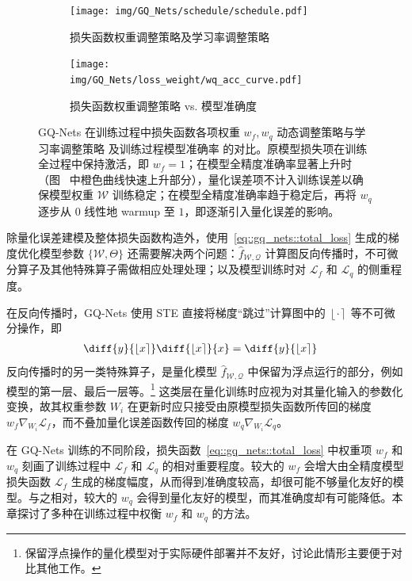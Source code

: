 \documentclass[
  fontset = mac,
]{shtthesis}
\providecommand{\Round}[1]{\left\lfloor #1 \right\rceil}
\begin{document}
\begin{figure}[htb]
  \centering
  \begin{subfigure}[t]{0.45\columnwidth}
    \centering
    \texttt{[image: img/GQ\_Nets/schedule/schedule.pdf]}
    \caption{损失函数权重调整策略及学习率调整策略}
    \label{img::gq_nets::w_fq_schedule}
  \end{subfigure}
  \quad
  \begin{subfigure}[t]{0.45\columnwidth}
    \centering
    \texttt{[image: img/GQ\_Nets/loss\_weight/wq\_acc\_curve.pdf]}
    \caption{损失函数权重调整策略 vs. 模型准确度}
    \label{img::gq_nets::schedule_acc}
  \end{subfigure}
  \caption{GQ-Nets 在训练过程中损失函数各项权重 $w_f, w_q$ 动态调整策略与学习率调整策略  及训练过程模型准确率  的对比。原模型损失项在训练全过程中保持激活，即 $w_f = 1$；在模型全精度准确率显著上升时（图~ 中橙色曲线快速上升部分），量化误差项不计入训练误差以确保模型权重 $\mathcal{W}$ 训练稳定；在模型全精度准确率趋于稳定后，再将 $w_q$ 逐步从 $0$ 线性地 warmup 至 $1$，即逐渐引入量化误差的影响。}
  \label{img::gq_nets::schedule}
\end{figure}

除量化误差建模及整体损失函数构造外，使用~\eqref{eq::gq_nets::total_loss} 生成的梯度优化模型参数 $\{\mathcal{W}, \Theta\}$ 还需要解决两个问题：$\hat{f}_{\mathcal{W, Q}}$ 计算图反向传播时，不可微分算子及其他特殊算子需做相应处理处理；以及模型训练时对 $\mathcal{L}_f$ 和 $\mathcal{L}_q$ 的侧重程度。

在反向传播时，GQ-Nets 使用 STE 直接将梯度“跳过”计算图中的 $\Round{\cdot}$ 等不可微分操作，即
\begin{align}
  \diff{y}{\Round{x}} \diff{\Round{x}}{x} &= \diff{y}{\Round{x}}
\end{align}
反向传播时的另一类特殊算子，是量化模型 $\hat{f}_{\mathcal{W, Q}}$ 中保留为浮点运行的部分，例如模型的第一层、最后一层等。\footnote{保留浮点操作的量化模型对于实际硬件部署并不友好，讨论此情形主要便于对比其他工作。} 这类层在量化训练时应视为对其量化输入的参数化变换，故其权重参数 $W_i$ 在更新时应只接受由原模型损失函数所传回的梯度 $w_f \nabla_{W_i}\mathcal{L}_f$，而不叠加量化误差函数传回的梯度 $w_q \nabla_{W_i}\mathcal{L}_q$。%

在 GQ-Nets 训练的不同阶段，损失函数~\eqref{eq::gq_nets::total_loss} 中权重项 $w_f$ 和 $w_q$ 刻画了训练过程中 $\mathcal{L}_f$ 和 $\mathcal{L}_q$ 的相对重要程度。较大的 $w_f$ 会增大由全精度模型损失函数 $\mathcal{L}_f$ 生成的梯度幅度，从而得到准确度较高，却很可能不够量化友好的模型。与之相对，较大的 $w_q$ 会得到量化友好的模型，而其准确度却有可能降低。本章探讨了多种在训练过程中权衡 $w_f$ 和 $w_q$ 的方法。
\end{document}
